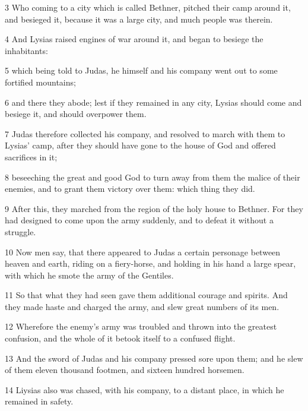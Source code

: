 \par 3 Who coming to a city which is called Bethner, pitched their camp around it, and besieged it, because it was a large city, and much people was therein. 

\par 4 And Lysias raised engines of war around it, and began to besiege the inhabitants: 

\par 5 which being told to Judas, he himself and his company went out to some fortified mountains; 

\par 6 and there they abode; lest if they remained in any city, Lysias should come and besiege it, and should overpower them. 

\par 7 Judas therefore collected his company, and resolved to march with them to Lysias’ camp, after they should have gone to the house of God and offered sacrifices in it; 

\par 8 beseeching the great and good God to turn away from them the malice of their enemies, and to grant them victory over them: which thing they did. 

\par 9 After this, they marched from the region of the holy house to Bethner. For they had designed to come upon the army suddenly, and to defeat it without a struggle. 

\par 10 Now men say, that there appeared to Judas a certain personage between heaven and earth, riding on a fiery-horse, and holding in his hand a large spear, with which he smote the army of the Gentiles. 

\par 11 So that what they had seen gave them additional courage and spirits. And they made haste and charged the army, and slew great numbers of its men. 

\par 12 Wherefore the enemy’s army was troubled and thrown into the greatest confusion, and the whole of it betook itself to a confused flight. 

\par 13 And the sword of Judas and his company pressed sore upon them; and he slew of them eleven thousand footmen, and sixteen hundred horsemen. 

\par 14 Liysias also was chased, with his company, to a distant place, in which he remained in safety.

